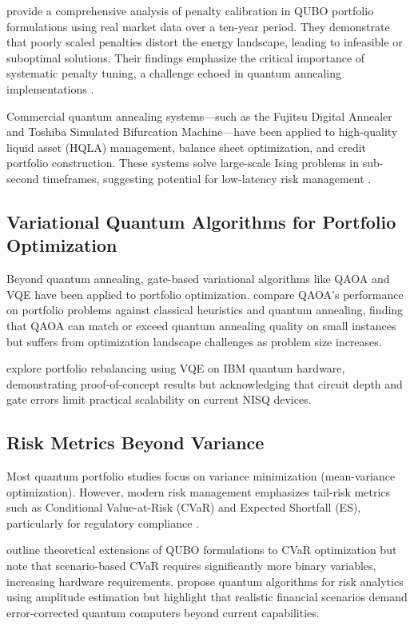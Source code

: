 \documentclass[12pt]{article}
\numberwithin{equation}{section}
\begin{document}
\citet{QIPQUBO2024} provide a comprehensive analysis of penalty calibration in QUBO portfolio formulations using real market data over a ten-year period. They demonstrate that poorly scaled penalties distort the energy landscape, leading to infeasible or suboptimal solutions. Their findings emphasize the critical importance of systematic penalty tuning, a challenge echoed in quantum annealing implementations \citep{Rebentrost2018QuantumFinance}.

Commercial quantum annealing systems—such as the Fujitsu Digital Annealer and Toshiba Simulated Bifurcation Machine—have been applied to high-quality liquid asset (HQLA) management, balance sheet optimization, and credit portfolio construction. These systems solve large-scale Ising problems in sub-second timeframes, suggesting potential for low-latency risk management \citep{Venturelli2019TemporalQA}.

\subsection{Variational Quantum Algorithms for Portfolio Optimization}

Beyond quantum annealing, gate-based variational algorithms like QAOA and VQE have been applied to portfolio optimization. \citet{Brandhofer2023QAOA} compare QAOA's performance on portfolio problems against classical heuristics and quantum annealing, finding that QAOA can match or exceed quantum annealing quality on small instances but suffers from optimization landscape challenges as problem size increases.

\citet{Phillipson2020Portfolio} explore portfolio rebalancing using VQE on IBM quantum hardware, demonstrating proof-of-concept results but acknowledging that circuit depth and gate errors limit practical scalability on current NISQ devices.

\subsection{Risk Metrics Beyond Variance}

Most quantum portfolio studies focus on variance minimization (mean-variance optimization). However, modern risk management emphasizes tail-risk metrics such as Conditional Value-at-Risk (CVaR) and Expected Shortfall (ES), particularly for regulatory compliance \citep{Rockafellar2000CVaR}.

\citet{Orus2019} outline theoretical extensions of QUBO formulations to CVaR optimization but note that scenario-based CVaR requires significantly more binary variables, increasing hardware requirements. \citet{Egger2020QuantumFinance} propose quantum algorithms for risk analytics using amplitude estimation but highlight that realistic financial scenarios demand error-corrected quantum computers beyond current capabilities.
\end{document}
